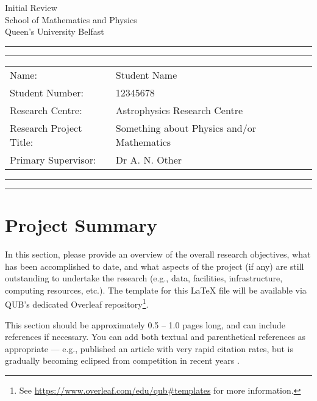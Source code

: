 \documentclass[10pt]{article}
\newcommand{\studentname}{Student Name}
\newcommand{\studentnumber}{12345678}
\newcommand{\researchcentre}{Astrophysics Research Centre}
\newcommand{\projecttitle}{Something about Physics and/or Mathematics}
\newcommand{\supervisor}{Dr A. N. Other}
\begin{document}
\begin{center}
{\Huge{Initial Review}} \\
\vspace{2mm}
{\Large{School of Mathematics and Physics}} \\
\vspace{1mm}
{\Large{Queen's University Belfast}}
\end{center}

\vspace{5mm}
\hrule
\vspace{1mm}
\hrule

\vspace{3mm}
\begin{tabular}{ll} 
Name:           	        & {\studentname}   \\ 
Student Number: 	        & {\studentnumber} \\ 
Research Centre: 	        & {\researchcentre}  \\ 
Research Project Title: 	& {\projecttitle}  \\ 
Primary Supervisor: 	    & {\supervisor}  \\ 
\end{tabular}

\vspace{3mm}
\hrule
\vspace{1mm}
\hrule

\section{Project Summary}
In this section, please provide an overview of the overall research objectives, what has been accomplished to date, and what aspects of the project (if any) are still outstanding to undertake the research (e.g., data, facilities, infrastructure, computing resources, etc.). The template for this {\LaTeX} file will be available via QUB's dedicated Overleaf repository\footnote{See \href{https://www.overleaf.com/edu/qub\#templates}{https://www.overleaf.com/edu/qub\#templates} for more information.}.

\vspace{2mm}
This section should be approximately 0.5 -- 1.0 pages long, and can include references if necessary. You can add both textual and parenthetical references as appropriate --- e.g., \citet{2012PhLB..716....1A} published an article with very rapid citation rates, but is gradually becoming eclipsed from competition in recent years \citep[e.g.,][to name but a few]{2018Natur.556...43C, 2018PhRvD..98c0001T, 2019ApJ...873..111I}.
\end{document}
